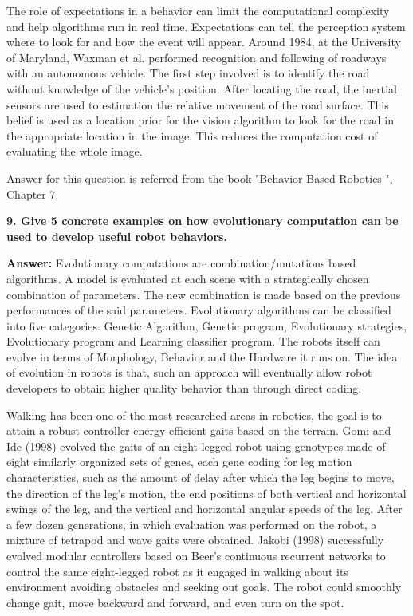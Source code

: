 \documentclass[a4paper, 10pt]{article}
\begin{document}
The role of expectations in a behavior can limit the computational complexity and help algorithms run in real time. Expectations can tell the perception system where to look for and how the event will appear. Around 1984, at the University of Maryland, Waxman et al. performed recognition and following of roadways with an autonomous vehicle. The first step involved is to identify the road without knowledge of the vehicle's position. After locating the road, the inertial sensors are used to estimation the relative movement of the road surface. This belief is used as a location prior for the vision algorithm to look for the road in the appropriate location in the image. This reduces the computation cost of evaluating the whole image.

Answer for this question is referred from the book "Behavior Based Robotics "\cite{arkin}, Chapter 7.


\hfill

\textbf{9. Give 5 concrete examples on how evolutionary computation can be used to develop useful robot behaviors.}

\textbf{Answer:} Evolutionary computations are combination/mutations based algorithms. A model is evaluated at each scene with a strategically chosen combination of parameters. The new combination is made based on the previous performances of the said parameters. Evolutionary algorithms can be classified into five categories: Genetic Algorithm, Genetic program, Evolutionary strategies, Evolutionary program and Learning classifier program. The robots itself can evolve in terms of Morphology, Behavior and the Hardware it runs on. The idea of evolution in robots is that, such an approach will eventually allow robot developers to obtain higher quality behavior than through direct coding.

Walking has been one of the most researched areas in robotics, the goal is to attain a robust controller energy efficient gaits based on the terrain. Gomi and Ide (1998) evolved the gaits of an eight-legged robot using genotypes made of eight similarly organized sets of genes, each gene coding for leg motion characteristics, such as the amount of delay after which the leg begins to move, the direction of the leg’s motion, the end positions of both vertical and horizontal swings of the leg, and the vertical and horizontal angular speeds of the leg. After a few dozen generations, in which evaluation was performed on the robot, a mixture of tetrapod and wave gaits were obtained. Jakobi (1998) successfully evolved modular controllers based on Beer’s continuous recurrent  networks to control the same eight-legged robot as it engaged in walking about its environment avoiding obstacles and seeking out goals. The robot could smoothly change gait, move backward and forward, and even turn on the spot. 
\end{document}
